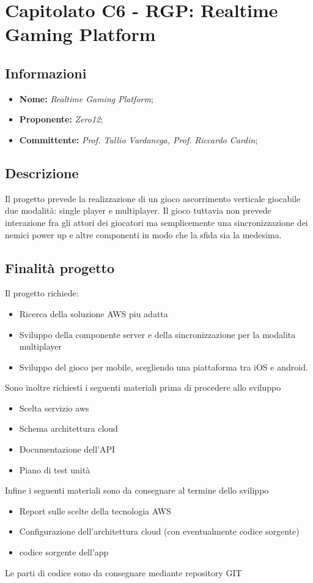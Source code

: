 \section{Capitolato C6 - RGP: Realtime Gaming Platform}
\subsection{Informazioni}
\begin{itemize}
    \item \textbf{Nome:} \textit{Realtime Gaming Platform}; 
    \item \textbf{Proponente:} \textit{Zero12};
    \item \textbf{Committente:} \textit{Prof. Tullio Vardanega, Prof. Riccardo Cardin};
\end{itemize}
\subsection{Descrizione}
Il progetto prevede la realizzazione di un gioco ascorrimento verticale giocabile due modalit\`a: single player e multiplayer. Il gioco tuttavia non prevede interazione fra gli attori dei giocatori ma semplicemente una sincronizzazione dei nemici power up e altre componenti in modo che la sfida sia la medesima.
\subsection{Finalit\`a progetto}
Il progetto richiede:
\begin{itemize}
    \item Ricerca della soluzione AWS piu adatta
    \item Sviluppo della componente server e della sincronizzazione per la modalita multiplayer
    \item Sviluppo del gioco per mobile, scegliendo una piattaforma tra iOS e android.
\end{itemize}
Sono inoltre richiesti i seguenti materiali prima di procedere allo sviluppo
\begin{itemize}
    \item Scelta servizio aws
    \item Schema architettura cloud
    \item Documentazione dell'API
    \item Piano di test unit\`a
\end{itemize}
Infine i seguenti materiali sono da consegnare al termine dello svilippo
\begin{itemize}
    \item Report sulle scelte della tecnologia AWS
    \item Configurazione dell'architettura cloud (con eventualmente codice sorgente)
    \item codice sorgente dell'app
\end{itemize}
Le parti di codice sono da consegnare mediante repository GIT
